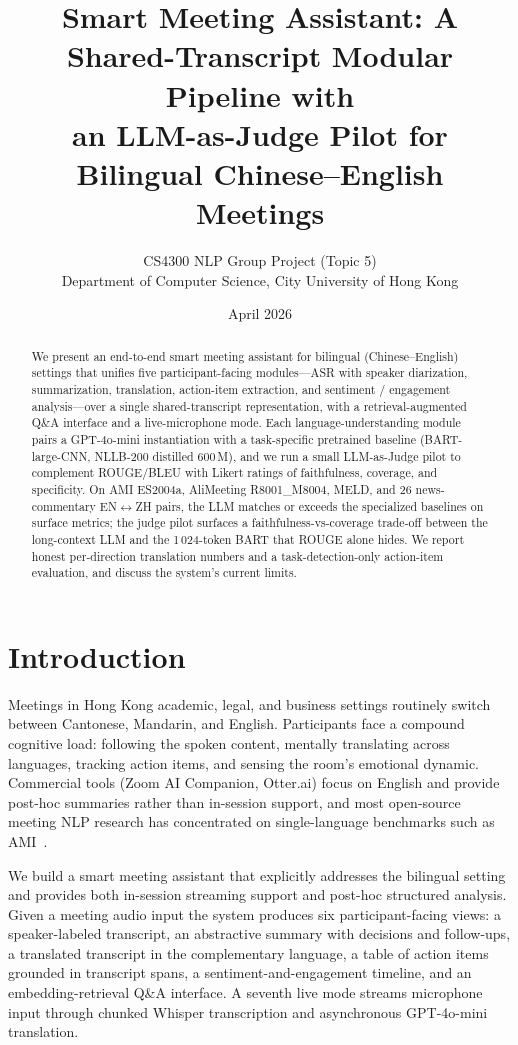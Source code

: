 \documentclass[11pt,a4paper]{article}
\title{Smart Meeting Assistant: A Shared-Transcript Modular Pipeline with \\
an LLM-as-Judge Pilot for Bilingual Chinese--English Meetings}
\author{CS4300 NLP Group Project (Topic 5) \\
Department of Computer Science, City University of Hong Kong}
\date{April 2026}
\begin{document}
\maketitle

\begin{abstract}
We present an end-to-end smart meeting assistant for bilingual
(Chinese--English) settings that unifies five participant-facing
modules---ASR with speaker diarization, summarization, translation,
action-item extraction, and sentiment / engagement analysis---over
a single shared-transcript representation, with a retrieval-augmented
Q\&A interface and a live-microphone mode. Each language-understanding
module pairs a GPT-4o-mini instantiation with a task-specific
pretrained baseline (BART-large-CNN, NLLB-200 distilled 600\,M), and
we run a small LLM-as-Judge pilot to complement ROUGE/BLEU with
Likert ratings of faithfulness, coverage, and specificity. On AMI
ES2004a, AliMeeting R8001\_M8004, MELD, and 26 news-commentary
EN$\leftrightarrow$ZH pairs, the LLM matches or exceeds the
specialized baselines on surface metrics; the judge pilot surfaces a
faithfulness-vs-coverage trade-off between the long-context LLM and
the 1\,024-token BART that ROUGE alone hides. We report honest
per-direction translation numbers and a task-detection-only
action-item evaluation, and discuss the system's current limits.
\end{abstract}

\section{Introduction}
\label{sec:intro}
Meetings in Hong Kong academic, legal, and business settings routinely
switch between Cantonese, Mandarin, and English. Participants face a
compound cognitive load: following the spoken content, mentally
translating across languages, tracking action items, and sensing the
room's emotional dynamic. Commercial tools (Zoom AI Companion, Otter.ai)
focus on English and provide post-hoc summaries rather than in-session
support, and most open-source meeting NLP research has concentrated on
single-language benchmarks such as AMI~\cite{carletta2006ami}.

We build a smart meeting assistant that explicitly addresses the
bilingual setting and provides both in-session streaming support and
post-hoc structured analysis. Given a meeting audio input the system
produces six participant-facing views: a speaker-labeled transcript, an
abstractive summary with decisions and follow-ups, a translated
transcript in the complementary language, a table of action items
grounded in transcript spans, a sentiment-and-engagement timeline, and
an embedding-retrieval Q\&A interface. A seventh live mode streams
microphone input through chunked Whisper transcription and asynchronous
GPT-4o-mini translation.
\end{document}
